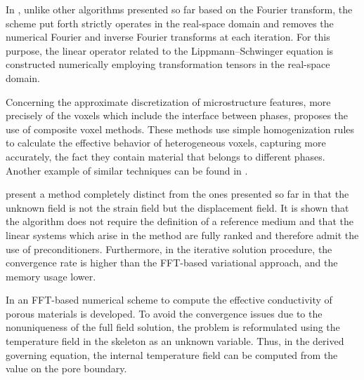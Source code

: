 In \cite{yvonnet_fast_2012}, unlike other algorithms presented so far based on the Fourier transform, the scheme put forth strictly operates in the real-space domain and removes the numerical Fourier and inverse Fourier transforms at each iteration. For this purpose, the linear operator related to the Lippmann–Schwinger equation is constructed numerically employing transformation tensors in the real-space domain.

Concerning the approximate discretization of microstructure features, more precisely of the voxels which include the interface between phases, \cite{mareau_different_2017} proposes the use of composite voxel methods.
These methods use simple homogenization rules to calculate the effective behavior of heterogeneous voxels, capturing more accurately, the fact they contain material that belongs to different phases.
Another example of similar techniques can be found in \cite{kabel_composite_2017}.

\cite{lucarini_dbfft_2019} present a method completely distinct from the ones presented so far in that the unknown field is not the strain field but the displacement field.
It is shown that the algorithm does not require the definition of a reference medium and that the linear systems which arise in the method are fully ranked and therefore admit the use of preconditioners.
Furthermore, in the iterative solution procedure, the convergence rate is higher than the FFT-based variational approach, and the memory usage lower.

In \cite{to_fft_2020} an FFT-based numerical scheme to compute the effective conductivity of porous materials is developed.
To avoid the convergence issues due to the nonuniqueness of the full field solution, the problem is reformulated using the temperature field in the skeleton as an unknown variable.
Thus, in the derived governing equation, the internal temperature field can be computed from the value on the pore boundary.
